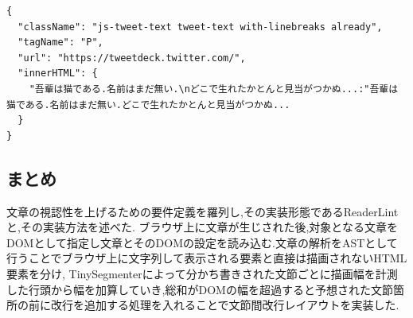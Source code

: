 \begin{lstlisting}
{
  "className": "js-tweet-text tweet-text with-linebreaks already",
  "tagName": "P",
  "url": "https://tweetdeck.twitter.com/",
  "innerHTML": {
    "吾輩は猫である.名前はまだ無い.\nどこで生れたかとんと見当がつかぬ...:"吾輩は猫である.名前はまだ無い.どこで生れたかとんと見当がつかぬ...
  }
}
\end{lstlisting}

\subsection{まとめ}
文章の視認性を上げるための要件定義を羅列し,その実装形態であるReaderLintと,その実装方法を述べた.
ブラウザ上に文章が生じされた後,対象となる文章をDOMとして指定し文章とそのDOMの設定を読み込む.文章の解析をASTとして行うことでブラウザ上に文字列して表示される要素と直接は描画されないHTML要素を分け,
TinySegmenterによって分かち書きされた文節ごとに描画幅を計測した行頭から幅を加算していき,総和がDOMの幅を超過すると予想された文節箇所の前に改行を追加する処理を入れることで文節間改行レイアウトを実装した.

